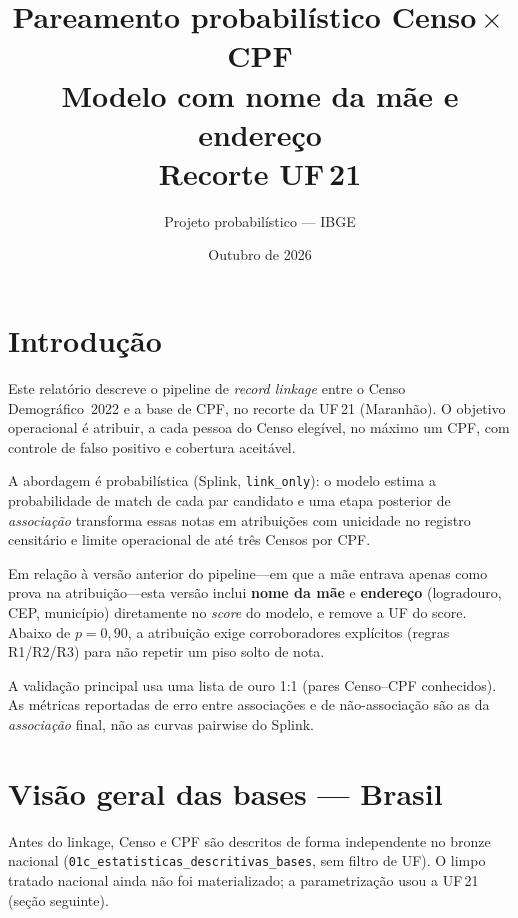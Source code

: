 \documentclass[11pt,a4paper]{article}
\title{Pareamento probabilístico Censo\,$\times$\,CPF\\
\large Modelo com nome da mãe e endereço\\
\large Recorte UF\,21}
\author{Projeto probabilístico --- IBGE}
\date{Outubro de 2026}
\begin{document}
\maketitle
\tableofcontents
\newpage

\section{Introdução}

Este relatório descreve o pipeline de \emph{record linkage} entre o Censo
Demográfico~2022 e a base de CPF, no recorte da UF\,21 (Maranhão). O objetivo
operacional é atribuir, a cada pessoa do Censo elegível, no máximo um CPF, com
controle de falso positivo e cobertura aceitável.

A abordagem é probabilística (Splink, \texttt{link\_only}): o modelo estima a
probabilidade de match de cada par candidato e uma etapa posterior de
\emph{associação} transforma essas notas em atribuições com unicidade no
registro censitário e limite operacional de até três Censos por CPF.

Em relação à versão anterior do pipeline---em que a mãe entrava apenas como
prova na atribuição---esta versão inclui \textbf{nome da mãe} e
\textbf{endereço} (logradouro, CEP, município) diretamente no \emph{score} do
modelo, e remove a UF do score. Abaixo de $p = 0{,}90$, a atribuição exige
corroboradores explícitos (regras R1/R2/R3) para não repetir um piso solto de
nota.

A validação principal usa uma lista de ouro 1:1 (pares Censo--CPF conhecidos).
As métricas reportadas de erro entre associações e de não-associação são as da
\emph{associação} final, não as curvas pairwise do Splink.

\section{Visão geral das bases --- Brasil}

Antes do linkage, Censo e CPF são descritos de forma independente no bronze
nacional (\texttt{01c\_estatisticas\_descritivas\_bases}, sem filtro de UF).
O limpo tratado nacional ainda não foi materializado; a parametrização usou
a UF\,21 (seção seguinte).
\end{document}
